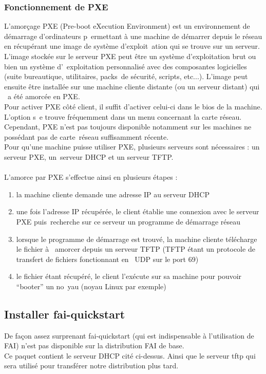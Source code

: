 \documentclass[a4paper,12pt,one side,titlepage]{report}
\begin{document}
\subsubsection{Fonctionnement de PXE}
L'amorçage PXE (Pre-boot eXecution Environment) est un environnement de démarrage d'ordinateurs p\
ermettant à une machine de démarrer depuis le réseau en récupérant une image de système d'exploit\
ation qui se trouve sur un serveur.\\
L'image stockée sur le serveur PXE peut être un système d'exploitation brut ou bien un système d'\
exploitation personnalisé avec des composantes logicielles (suite bureautique, utilitaires, packs\
 de sécurité, scripts, etc...).
L'image peut ensuite être installée sur une machine cliente distante (ou un serveur distant) qui \
a été amorcée en PXE.\\

Pour activer PXE côté client, il suffit d'activer celui-ci dans le bios de la machine. L’option s\
e trouve fréquemment dans un menu concernant la carte réseau.
Cependant, PXE n'est pas toujours disponible notamment sur les machines ne possédant pas de carte\
 réseau suffisamment récente.
\\
Pour qu'une machine puisse utiliser PXE, plusieurs serveurs sont nécessaires : un serveur PXE, un\
 serveur DHCP et un serveur TFTP.\\\\
L'amorce par PXE s'effectue ainsi en plusieurs étapes :
\begin{enumerate}
  \item la machine cliente demande une adresse IP au serveur DHCP
  \item une fois l'adresse IP récupérée, le client établie une connexion avec le serveur PXE puis\
 recherche sur ce serveur un programme de démarrage réseau
  \item lorsque le programme de démarrage est trouvé, la machine cliente télécharge le fichier à \
amorcer depuis un serveur TFTP (TFTP étant un protocole de transfert de fichiers fonctionnant en \
UDP sur le port 69)
  \item le fichier étant récupéré, le client l'exécute sur sa machine pour pouvoir ``booter'' un no\
yau (noyau Linux par exemple)
\end{enumerate}

\subsection{Installer fai-quickstart}
De façon assez surprenant fai-quickstart (qui est indispensable à l'utilisation de FAI) n'est pas disponible sur la distribution FAI de base.\\
Ce paquet contient le serveur DHCP cité ci-dessus. Ainsi que le serveur tftp qui sera utilisé pour transférer notre distribution plus tard.
\end{document}
